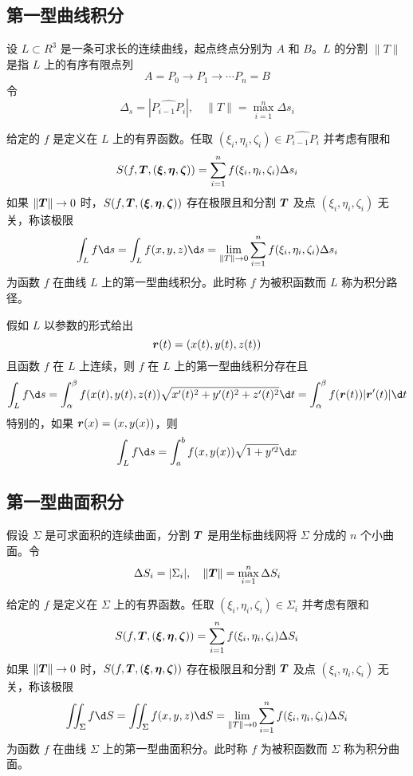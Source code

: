 \subsection{第一型曲线积分}

设 $L \subset R^3$ 是一条可求长的连续曲线，起点终点分别为 $A$ 和 $B$。$L$ 的分割 $\|T\|$ 是指 $L$ 上的有序有限点列
\[ A = P_0 \to P_1 \to \cdots P_n = B \]
令
\[ \Delta_s = \left| \widehat{P_{i-1}P_i} \right|, \quad \|T\| = \max_{i=1}^n \Delta s_i \]

\begin{definition}
	给定的 $f$ 是定义在 $L$ 上的有界函数。任取 $(\xi_i, \eta_i, \zeta_i) \in \widehat{P_{i-1} P_i}$ 并考虑有限和
	\[ S(f, \boldsymbol{T}, (\boldsymbol{\xi}, \boldsymbol{\eta}, \boldsymbol{\zeta})) = \sum_{i=1}^{n} f(\xi_i, \eta_i, \zeta_i)\Delta s_i \]
	如果 $\|\boldsymbol{T}\| \to 0$ 时，$S(f, \boldsymbol{T}, (\boldsymbol{\xi}, \boldsymbol{\eta}, \boldsymbol{\zeta}))$ 存在极限且和分割 $\boldsymbol{T}$ 及点 $(\xi_i, \eta_i, \zeta_i)$ 无关，称该极限
	\[ \int_L f \d s = \int_{L} f(x, y, z) \d s = \lim_{\|T\| \to 0} \sum_{i=1}^{n} f(\xi_i, \eta_i, \zeta_i) \Delta s_i \]
	为函数 $f$ 在曲线 $L$ 上的第一型曲线积分。此时称 $f$ 为被积函数而 $L$ 称为积分路径。
\end{definition}

假如 $L$ 以参数的形式给出
\[ \boldsymbol{r}(t) = (x(t), y(t), z(t)) \]
且函数 $f$ 在 $L$ 上连续，则 $f$ 在 $L$ 上的第一型曲线积分存在且
\[ \int_L f \d s = \int_{\alpha}^{\beta}f(x(t), y(t), z(t)) \sqrt{x'(t)^2 + y'(t)^2 + z'(t)^2} \d t = \int_{\alpha}^\beta f(\vbf{r}(t))|\vbf{r}'(t)| \d t \]
特别的，如果 $\boldsymbol{r}(x) = (x, y(x))$，则
\[ \int_L f \d s = \int_{a}^{b} f(x, y(x)) \sqrt{1 + y'^2} \d x \]

\subsection{第一型曲面积分}

假设 $\Sigma$ 是可求面积的连续曲面，分割 $\boldsymbol{T}$ 是用坐标曲线网将 $\Sigma$ 分成的 $n$ 个小曲面。令
\[ \Delta S_i = |\Sigma_i|, \quad \|\boldsymbol{T}\| = \max_{i=1}^n \Delta S_i \]

\begin{definition}
	给定的 $f$ 是定义在 $\Sigma$ 上的有界函数。任取 $(\xi_i, \eta_i, \zeta_i) \in \Sigma_i$ 并考虑有限和
	\[ S(f, \boldsymbol{T}, (\boldsymbol{\xi}, \boldsymbol{\eta}, \boldsymbol{\zeta})) = \sum_{i=1}^{n} f(\xi_i, \eta_i, \zeta_i)\Delta S_i \]
	如果 $\|\boldsymbol{T}\| \to 0$ 时，$S(f, \boldsymbol{T}, (\boldsymbol{\xi}, \boldsymbol{\eta}, \boldsymbol{\zeta}))$ 存在极限且和分割 $\boldsymbol{T}$ 及点 $(\xi_i, \eta_i, \zeta_i)$ 无关，称该极限
	\[ \iint_\Sigma f \d S = \iint_{\Sigma} f(x, y, z) \d S = \lim_{\|T\| \to 0} \sum_{i=1}^{n} f(\xi_i, \eta_i, \zeta_i) \Delta S_i \]
	为函数 $f$ 在曲线 $\Sigma$ 上的第一型曲面积分。此时称 $f$ 为被积函数而 $\Sigma$ 称为积分曲面。
\end{definition}

